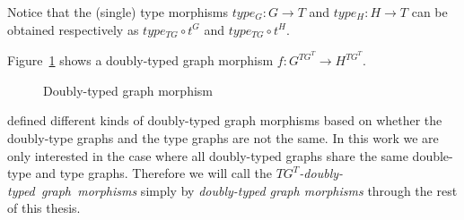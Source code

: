 Notice that the (single) type morphisms $type_G : G \rightarrow T$ and $type_H : H \rightarrow T$ can be obtained respectively as $type_{TG} \circ t^G$ and $type_{TG} \circ t^H$.

\begin{example} Figure~\ref{fig:process:doubly-typed-graph-morphism} shows a doubly-typed graph morphism $f : G^{TG^T} \rightarrow H^{TG^T}$.

\begin{figure}[!ht]
  \centering
  \caption{Doubly-typed graph morphism}\label{fig:process:doubly-typed-graph-morphism}
\end{figure}
\end{example}

\begin{remark} \cite{Ribeiro1996} defined different kinds of doubly-typed graph morphisms based on whether the doubly-type graphs and the type graphs are not the same. In this work we are only interested in the case where all doubly-typed graphs share the same double-type and type graphs. Therefore we will call the \mbox{\emph{$TG^T$-doubly-typed graph morphisms}} simply by \emph{doubly-typed graph morphisms} through the rest of this thesis.

\end{remark}


